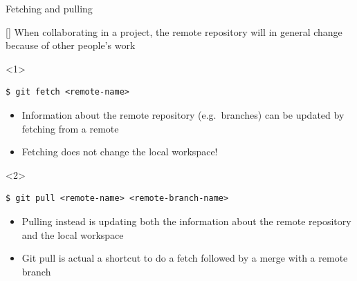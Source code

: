 \documentclass[usenames,svgnames,14pt]{beamer}
\begin{document}
\begin{frame}[fragile]{Fetching and pulling}
    \vspace{-3mm}
    \begin{overlayarea}{\textwidth}{0.7\textheight}
        \begin{varblock}{}[\textwidth]{}
            When collaborating in a project, the remote repository will in general change because of other people's work
        \end{varblock}
        \vspace{3mm}
        \begin{onlyenv}<1>
            \begin{lstlisting}[style=MyBash]
                $ git fetch <remote-name>
            \end{lstlisting}
            \begin{itemize}
                \item Information about the remote repository (e.g.\ branches) can be updated by fetching from a remote
                \item \alert{Fetching does not change the local workspace!}
            \end{itemize}
        \end{onlyenv}
        \begin{onlyenv}<2>
            \begin{lstlisting}[style=MyBash]
                $ git pull <remote-name> <remote-branch-name>
            \end{lstlisting}
            \begin{itemize}
                \item Pulling instead is updating both the information about the remote repository and the local workspace
                \item \alert{Git pull is actual a shortcut to do a fetch followed by a merge with a remote branch}
            \end{itemize}
        \end{onlyenv}
    \end{overlayarea}
\end{frame}
\end{document}
